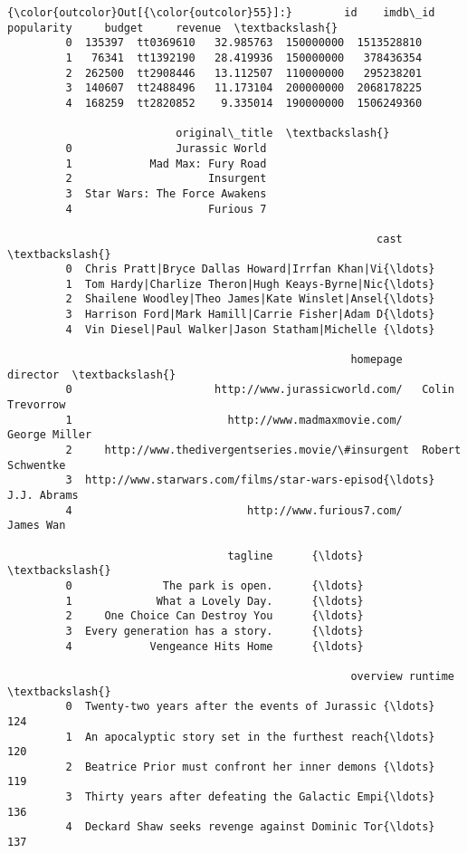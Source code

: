 \documentclass[11pt]{article}
\begin{document}
\begin{Verbatim}[commandchars=\\\{\}]
{\color{outcolor}Out[{\color{outcolor}55}]:}        id    imdb\_id  popularity     budget     revenue  \textbackslash{}
         0  135397  tt0369610   32.985763  150000000  1513528810   
         1   76341  tt1392190   28.419936  150000000   378436354   
         2  262500  tt2908446   13.112507  110000000   295238201   
         3  140607  tt2488496   11.173104  200000000  2068178225   
         4  168259  tt2820852    9.335014  190000000  1506249360   
         
                          original\_title  \textbackslash{}
         0                Jurassic World   
         1            Mad Max: Fury Road   
         2                     Insurgent   
         3  Star Wars: The Force Awakens   
         4                     Furious 7   
         
                                                         cast  \textbackslash{}
         0  Chris Pratt|Bryce Dallas Howard|Irrfan Khan|Vi{\ldots}   
         1  Tom Hardy|Charlize Theron|Hugh Keays-Byrne|Nic{\ldots}   
         2  Shailene Woodley|Theo James|Kate Winslet|Ansel{\ldots}   
         3  Harrison Ford|Mark Hamill|Carrie Fisher|Adam D{\ldots}   
         4  Vin Diesel|Paul Walker|Jason Statham|Michelle {\ldots}   
         
                                                     homepage          director  \textbackslash{}
         0                      http://www.jurassicworld.com/   Colin Trevorrow   
         1                        http://www.madmaxmovie.com/     George Miller   
         2     http://www.thedivergentseries.movie/\#insurgent  Robert Schwentke   
         3  http://www.starwars.com/films/star-wars-episod{\ldots}       J.J. Abrams   
         4                           http://www.furious7.com/         James Wan   
         
                                  tagline      {\ldots}       \textbackslash{}
         0              The park is open.      {\ldots}        
         1             What a Lovely Day.      {\ldots}        
         2     One Choice Can Destroy You      {\ldots}        
         3  Every generation has a story.      {\ldots}        
         4            Vengeance Hits Home      {\ldots}        
         
                                                     overview runtime  \textbackslash{}
         0  Twenty-two years after the events of Jurassic {\ldots}     124   
         1  An apocalyptic story set in the furthest reach{\ldots}     120   
         2  Beatrice Prior must confront her inner demons {\ldots}     119   
         3  Thirty years after defeating the Galactic Empi{\ldots}     136   
         4  Deckard Shaw seeks revenge against Dominic Tor{\ldots}     137   
         

\end{Verbatim}
\end{document}
